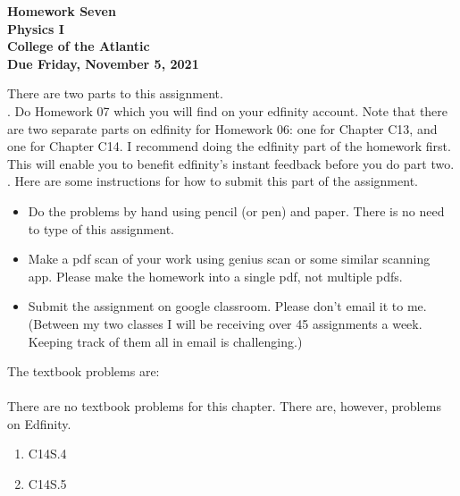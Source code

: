 \documentclass[12pt]{article}
\begin{document}
\pagestyle{empty}
 
\begin{center}
{\LARGE {\bf Homework Seven}}\\
\bigskip
{\Large {\bf Physics I}}\\
\bigskip
{\Large {\bf College of the Atlantic}}\\
\bigskip
{ {\bf Due Friday, November 5, 2021}}\\ 
\end{center}
\medskip

\noindent There are two parts to this assignment.\\


.  Do Homework 07 which you will find
on your edfinity account.  Note that there are two separate parts on
edfinity for Homework 06: one for Chapter C13, and one for Chapter
C14.  I recommend doing the edfinity part of the homework first.  This
will enable you to benefit edfinity's instant feedback before you do
part two.\\  


.  Here are some
instructions for how to submit this part of the assignment.
\begin{itemize}
\item Do the problems by hand using pencil (or pen) and paper.
  There is no need to type of this assignment.
\item Make a pdf scan of your work using genius scan or some
  similar scanning app.  Please make the homework into a single
  pdf, not multiple pdfs.
\item Submit the assignment on google classroom.  Please don't
  email it to me.  (Between my two classes I will be receiving
  over 45 assignments a week.  Keeping track of them all in email
  is challenging.)\\
\end{itemize}

\noindent The textbook problems are:\\   
 
\\

\noindent There are no textbook problems for this chapter.  There are,
however, problems on Edfinity.\\

\begin{enumerate}
  \setlength{\itemsep}{0mm}
  \item C14S.4
  \item C14S.5\\
  \end{enumerate}
\end{document}
